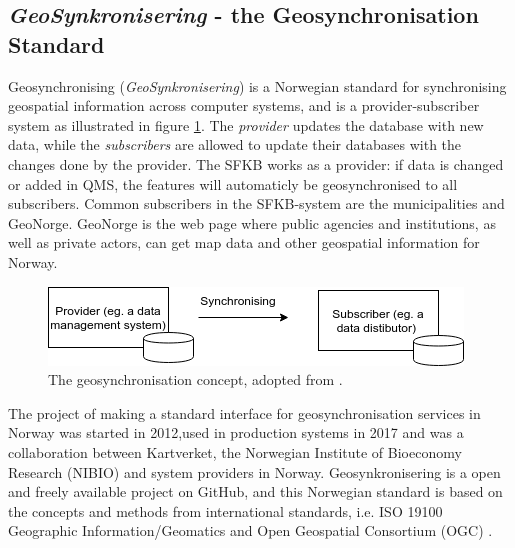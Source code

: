 


\subsection{\textit{GeoSynkronisering} - the Geosynchronisation Standard}\label{geosync}

Geosynchronising (\textit{GeoSynkronisering}) is a Norwegian standard for synchronising geospatial information across computer systems, and is a provider-subscriber system as illustrated in figure \ref{fig:geosync}. The \textit{provider} updates the database with new data, while the \textit{subscribers} are allowed to update their databases with the changes done by the provider. The SFKB works as a provider: if data is changed or added in QMS, the features will automaticly be geosynchronised to all subscribers. Common subscribers in the SFKB-system are the municipalities and GeoNorge. GeoNorge is the web page where public agencies and institutions, as well as private actors, can get map data and other geospatial information for Norway.  
\\
\begin{figure}[H]
	\centering
	\includegraphics[scale=0.6]{img/geosync.png}
	\caption{The geosynchronisation concept, adopted from \cite[p.~16]{Kartverket2013}. }
	\label{fig:geosync}
\end{figure}


The project of making a standard interface for geosynchronisation services in Norway was started in 2012,used in production systems in 2017 and was a collaboration between Kartverket, the Norwegian Institute of Bioeconomy Research (NIBIO) and system providers in Norway. Geosynkronisering is a open and freely available project on GitHub, and this Norwegian standard is based on the concepts and methods from international standards, i.e. ISO 19100 Geographic Information/Geomatics and Open Geospatial Consortium (OGC) \citep{Eggan2017,Kartverket2013}.

